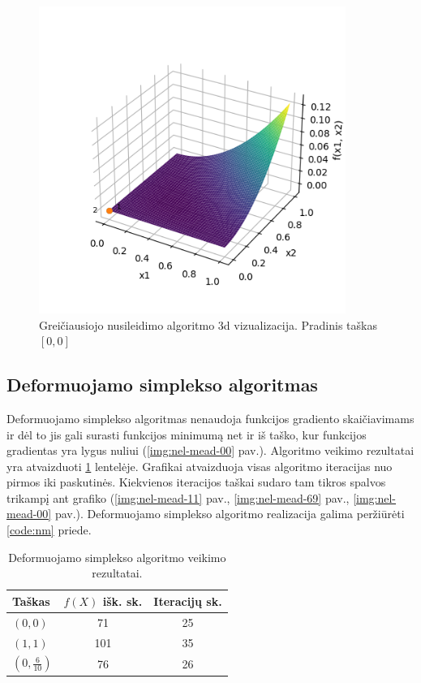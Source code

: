 \documentclass{VUMIFPSkursinis}
\begin{document}
\begin{figure}[H]
  \centering
  \includegraphics[width=10cm]{img/steepest_descent_3d_[0.0,0.0].png}
  \caption{Greičiausiojo nusileidimo algoritmo 3d vizualizacija. Pradinis taškas $[0, 0]$}
  \label{img:steep-des-3d-00}
\end{figure}

\subsection{Deformuojamo simplekso algoritmas}

Deformuojamo simplekso algoritmas nenaudoja funkcijos gradiento skaičiavimams ir dėl to jis
gali surasti funkcijos minimumą net ir iš taško, kur funkcijos
gradientas yra lygus nuliui (\ref{img:nel-mead-00} pav.).
Algoritmo veikimo rezultatai yra atvaizduoti \ref{table:nel-mead} lentelėje.
Grafikai atvaizduoja visas algoritmo iteracijas nuo pirmos iki paskutinės.
Kiekvienos iteracijos taškai sudaro tam tikros spalvos trikampį ant grafiko
(\ref{img:nel-mead-11} pav., \ref{img:nel-mead-69} pav., \ref{img:nel-mead-00} pav.).
Deformuojamo simplekso algoritmo realizacija galima peržiūrėti \ref{code:nm} priede.

\begin{table}[H]
  \centering
  \caption{Deformuojamo simplekso algoritmo veikimo rezultatai.}
  \begin{tabular}{l c c}
    \hline\hline
    Taškas                         & $f(X)$ išk. sk. & Iteracijų sk. \\ [0.5ex]
    \hline
    $(0, 0)$                       & 71              & 25            \\
    $(1, 1)$                       & 101             & 35            \\
    $({0}, \frac{6}{10})$ & 76             & 26            \\ [1ex]
    \hline
  \end{tabular}
  \label{table:nel-mead}
\end{table}
\end{document}
